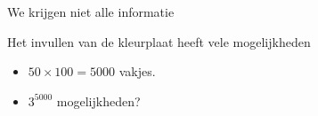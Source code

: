 \documentclass{beamer}
\begin{document}
\begin{frame}{We krijgen niet alle informatie}

\end{frame}
	
	
\begin{frame}{Het invullen van de kleurplaat heeft vele mogelijkheden}

\begin{itemize}
	\item $50 \times 100=5000$ vakjes.
	\item $3^{5000}$ mogelijkheden?
\end{itemize}

	
\end{frame}
	
	
\end{document}
